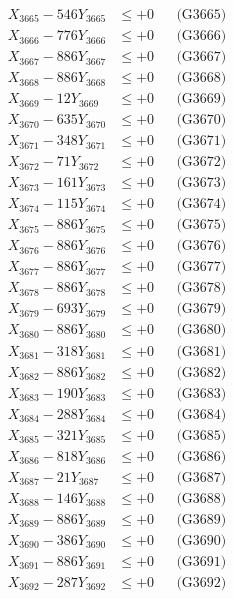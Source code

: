 \documentclass[a4paper,10pt]{article}
\begin{document}
{\begin{align}
X_{3665} - 546Y_{3665} &\leq +0 && \text{(G3665)} \\
X_{3666} - 776Y_{3666} &\leq +0 && \text{(G3666)} \\
X_{3667} - 886Y_{3667} &\leq +0 && \text{(G3667)} \\
X_{3668} - 886Y_{3668} &\leq +0 && \text{(G3668)} \\
X_{3669} - 12Y_{3669} &\leq +0 && \text{(G3669)} \\
X_{3670} - 635Y_{3670} &\leq +0 && \text{(G3670)} \\
\allowbreak
X_{3671} - 348Y_{3671} &\leq +0 && \text{(G3671)} \\
X_{3672} - 71Y_{3672} &\leq +0 && \text{(G3672)} \\
X_{3673} - 161Y_{3673} &\leq +0 && \text{(G3673)} \\
X_{3674} - 115Y_{3674} &\leq +0 && \text{(G3674)} \\
X_{3675} - 886Y_{3675} &\leq +0 && \text{(G3675)} \\
X_{3676} - 886Y_{3676} &\leq +0 && \text{(G3676)} \\
X_{3677} - 886Y_{3677} &\leq +0 && \text{(G3677)} \\
X_{3678} - 886Y_{3678} &\leq +0 && \text{(G3678)} \\
X_{3679} - 693Y_{3679} &\leq +0 && \text{(G3679)} \\
X_{3680} - 886Y_{3680} &\leq +0 && \text{(G3680)} \\
\allowbreak
X_{3681} - 318Y_{3681} &\leq +0 && \text{(G3681)} \\
X_{3682} - 886Y_{3682} &\leq +0 && \text{(G3682)} \\
X_{3683} - 190Y_{3683} &\leq +0 && \text{(G3683)} \\
X_{3684} - 288Y_{3684} &\leq +0 && \text{(G3684)} \\
X_{3685} - 321Y_{3685} &\leq +0 && \text{(G3685)} \\
X_{3686} - 818Y_{3686} &\leq +0 && \text{(G3686)} \\
X_{3687} - 21Y_{3687} &\leq +0 && \text{(G3687)} \\
X_{3688} - 146Y_{3688} &\leq +0 && \text{(G3688)} \\
X_{3689} - 886Y_{3689} &\leq +0 && \text{(G3689)} \\
X_{3690} - 386Y_{3690} &\leq +0 && \text{(G3690)} \\
\allowbreak
X_{3691} - 886Y_{3691} &\leq +0 && \text{(G3691)} \\
X_{3692} - 287Y_{3692} &\leq +0 && \text{(G3692)} \\

\end{align}}
\end{document}
